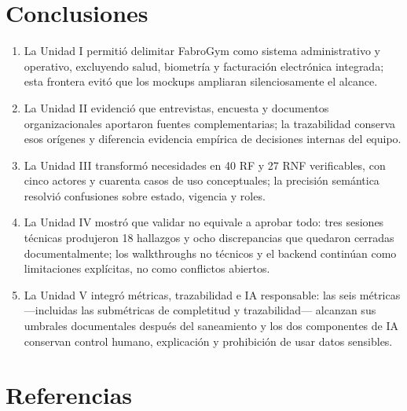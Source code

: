 \documentclass[11pt,a4paper]{article}
\begin{document}
\section{Conclusiones}

\begin{enumerate}
\item La Unidad I permitió delimitar FabroGym como sistema administrativo y operativo, excluyendo salud, biometría y facturación electrónica integrada; esta frontera evitó que los mockups ampliaran silenciosamente el alcance.
\item La Unidad II evidenció que entrevistas, encuesta y documentos organizacionales aportaron fuentes complementarias; la trazabilidad conserva esos orígenes y diferencia evidencia empírica de decisiones internas del equipo.
\item La Unidad III transformó necesidades en 40 RF y 27 RNF verificables, con cinco actores y cuarenta casos de uso conceptuales; la precisión semántica resolvió confusiones sobre estado, vigencia y roles.
\item La Unidad IV mostró que validar no equivale a aprobar todo: tres sesiones técnicas produjeron 18 hallazgos y ocho discrepancias que quedaron cerradas documentalmente; los walkthroughs no técnicos y el backend continúan como limitaciones explícitas, no como conflictos abiertos.
\item La Unidad V integró métricas, trazabilidad e IA responsable: las seis métricas —incluidas las submétricas de completitud y trazabilidad— alcanzan sus umbrales documentales después del saneamiento y los dos componentes de IA conservan control humano, explicación y prohibición de usar datos sensibles.
\end{enumerate}


\section*{Referencias}
\end{document}
